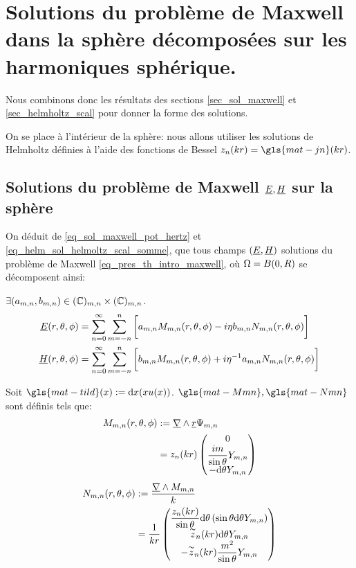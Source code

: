 \section{Solutions du problème de Maxwell dans la sphère décomposées sur les harmoniques sphérique.}\label{sec_maxwell_harmonique}

Nous combinons donc les résultats des sections \ref{sec_sol_maxwell} et \ref{sec_helmholtz_scal} pour donner la forme des solutions.

On se place à l'intérieur de la sphère: nous allons utiliser les solutions de Helmholtz définies à l'aide des fonctions de Bessel $z_n(kr) = \gls{mat-jn}(kr)$.



\subsection{Solutions du problème de Maxwell $\underline{E},\underline{H}$ sur la sphère}
On déduit de  \eqref{eq_sol_maxwell_pot_hertz} et \eqref{eq_helm_sol_helmoltz_scal_somme}, que tous champs $(\underline{E},\underline{H})$ solutions du problème de Maxwell \eqref{eq_pres_th_intro_maxwell}, où $\Omega = B(0,R)$ se décomposent ainsi:

$\exists (a_{m,n},b_{m,n}) \in (\mathbb C)_{m,n}\times (\mathbb C)_{m,n}$.
\begin{align*}
  \underline{E}(r,\theta,\phi) &= \sum\limits_{n=0}^\infty\sum\limits_{m=-n}^n\bigg[ a_{m,n}   M_{m,n}(r,\theta,\phi) - i \eta b_{m,n} N_{m,n}(r,\theta,\phi)\bigg]\\
  \underline{H}(r,\theta,\phi) &= \sum\limits_{n=0}^\infty\sum\limits_{m=-n}^n\bigg[ b_{m,n}   M_{m,n}(r,\theta,\phi) + i {\eta}^{-1} a_{m,n} N_{m,n}(r,\theta,\phi)\bigg]
\end{align*}

Soit $\gls{mat-tild}(x) := \dd{x}{\left(xu(x)\right)}$. $\gls{mat-Mmn} ,\gls{mat-Nmn}$ sont définis tels que:
\begin{align}
 \label{eq_defMmn}
  M_{m,n}(r,\theta,\phi) &:= \underline{\nabla} \wedge \underline{r} \Psi_{m,n} \\
  &= z_n(kr)
  \begin{pmatrix}
    0 \\ \dfrac{im}{\sin\theta}Y_{m,n}\\ 
    - \mathrm{d}{\theta}{Y_{m,n}}
  \end{pmatrix}
\end{align}
\begin{align}
\label{eq_defNmn}
  N_{m,n}(r,\theta,\phi) &:= \dfrac{\underline{\nabla} \wedge M_{m,n}}{k} \\
  &= \dfrac{1}{kr}\begin{pmatrix}
    \dfrac{z_n(kr)}{\sin\theta}\mathrm{d}{\theta}\left(\sin\theta\mathrm{d}{\theta}{Y_{m,n}}\right)\\ 
    \overset{\thicksim}{z}_n(kr)\mathrm{d}{\theta}{Y_{m,n}}\\ 
    -\overset{\thicksim}{z}_n(kr)\dfrac{m^2}{\sin\theta}Y_{m,n}\\
  \end{pmatrix} 
\end{align}


